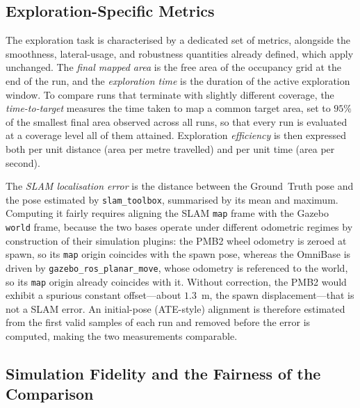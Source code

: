 \subsection{Exploration-Specific Metrics}
\label{subsec:m-exploration}

The exploration task is characterised by a dedicated set of metrics, alongside the smoothness, lateral-usage, and robustness quantities already defined, which apply unchanged. The \emph{final mapped area} is the free area of the occupancy grid at the end of the run, and the \emph{exploration time} is the duration of the active exploration window. To compare runs that terminate with slightly different coverage, the \emph{time-to-target} measures the time taken to map a common target area, set to $95\%$ of the smallest final area observed across all runs, so that every run is evaluated at a coverage level all of them attained. Exploration \emph{efficiency} is then expressed both per unit distance (area per metre travelled) and per unit time (area per second).

The \emph{SLAM localisation error} is the distance between the Ground~Truth pose and the pose estimated by \texttt{slam\_toolbox}, summarised by its mean and maximum. Computing it fairly requires aligning the SLAM \texttt{map} frame with the Gazebo \texttt{world} frame, because the two bases operate under different odometric regimes by construction of their simulation plugins: the PMB2 wheel odometry is zeroed at spawn, so its \texttt{map} origin coincides with the spawn pose, whereas the OmniBase is driven by \texttt{gazebo\_ros\_planar\_move}, whose odometry is referenced to the world, so its \texttt{map} origin already coincides with it. Without correction, the PMB2 would exhibit a spurious constant offset---about $1.3$~m, the spawn displacement---that is not a SLAM error. An initial-pose (ATE-style) alignment is therefore estimated from the first valid samples of each run and removed before the error is computed, making the two measurements comparable.

\subsection{Simulation Fidelity and the Fairness of the Comparison}
\label{subsec:m-fidelity}


